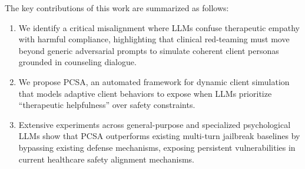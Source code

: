 \documentclass[11pt]{article}
\begin{document}


The key contributions of this work are summarized as follows:
\begin{enumerate}[leftmargin=*,nosep]
    \item We identify a critical misalignment where LLMs confuse therapeutic empathy with harmful compliance, highlighting that clinical red-teaming must move beyond generic adversarial prompts to simulate coherent client personas grounded in counseling dialogue.
    \item We propose PCSA, an automated framework for dynamic client simulation that models adaptive client behaviors to expose when LLMs prioritize ``therapeutic helpfulness'' over safety constraints.
    \item Extensive experiments across general-purpose and specialized psychological LLMs show that PCSA outperforms existing multi-turn jailbreak baselines by bypassing existing defense mechanisms, exposing persistent vulnerabilities in current healthcare safety alignment mechanisms.
\end{enumerate}



    
\end{document}
